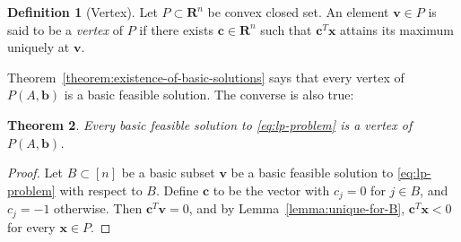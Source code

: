 \documentclass{amsbook}
\newcommand{\vv}{\mathbf v}
\newcommand{\xx}{\mathbf x}
\newcommand{\cc}{\mathbf c}
\newcommand{\bb}{\mathbf b}
\newcommand{\RR}{\mathbf R}
\newtheorem{theorem}{Theorem}[section]
\theoremstyle{definition}
\newtheorem{definition}[theorem]{Definition}
\theoremstyle{remark}
\begin{document}
\begin{definition}
  [Vertex]
  \label{definition:vertex}
  Let $P\subset \RR^n$ be convex closed set.
  An element $\vv\in P$ is said to be a \emph{vertex} of $P$ if there exists $\cc\in \RR^n$ such that $\cc^T\xx$ attains its maximum uniquely at $\vv$.
\end{definition}
Theorem~\ref{theorem:existence-of-basic-solutions} says that every vertex of $P(A,\bb)$ is a basic feasible solution.
The converse is also true:
\begin{theorem}
  Every basic feasible solution to \eqref{eq:lp-problem} is a vertex of $P(A,\bb)$.
\end{theorem}
\begin{proof}
  Let $B\subset [n]$ be a basic subset $\vv$ be a basic feasible solution to \eqref{eq:lp-problem} with respect to $B$.
  Define $\cc$ to be the vector with $c_j=0$ for $j\in B$, and $c_j=-1$ otherwise.
  Then $\cc^T\vv=0$, and by Lemma~\ref{lemma:unique-for-B}, $\cc^T\xx<0$ for every $\xx\in P$.
\end{proof}
\end{document}
